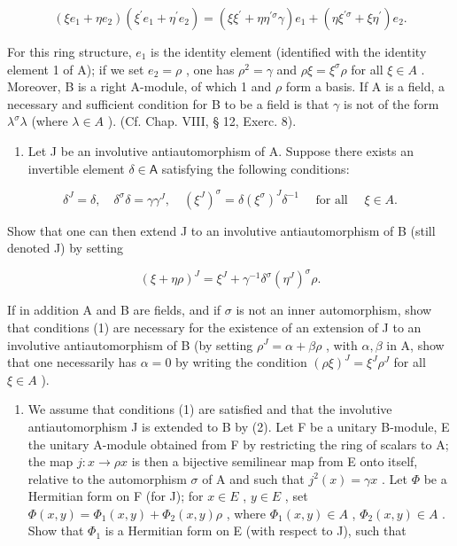 \[
(\xi e _ {1} + \eta e _ {2}) (\xi^ {\prime} e _ {1} + \eta^ {\prime} e _ {2}) = (\xi \xi^ {\prime} + \eta \eta^ {\prime \sigma} \gamma) e _ {1} + (\eta \xi^ {\prime \sigma} + \xi \eta^ {\prime}) e _ {2}.
\]

For this ring structure, \(e_1\) is the identity element (identified with the identity element 1 of A); if we set \(e_2 = \rho\) , one has \(\rho^2 = \gamma\) and \(\rho\xi = \xi^\sigma\rho\) for all \(\xi \in A\) . Moreover, B is a right A-module, of which 1 and \(\rho\) form a basis. If A is a field, a necessary and sufficient condition for B to be a field is that \(\gamma\) is not of the form \(\lambda^\sigma\lambda\) (where \(\lambda \in A\) ). (Cf. Chap. VIII, § 12, Exerc. 8).

\begin{enumerate}
\def\labelenumi{\alph{enumi})}
\setcounter{enumi}{1}
\tightlist
\item
  Let J be an involutive antiautomorphism of A. Suppose there exists an invertible element \(\delta\in\mathsf{A}\) satisfying the following conditions:
\end{enumerate}

\[
\delta^ {J} = \delta , \quad \delta^ {\sigma} \delta = \gamma \gamma^ {J}, \quad (\xi^ {J}) ^ {\sigma} = \delta (\xi^ {\sigma}) ^ {J} \delta^ {- 1} \quad \text { for   all } \quad \xi \in A.\tag{1}
\]

Show that one can then extend J to an involutive antiautomorphism of B (still denoted J) by setting

\[
(\xi + \eta \rho) ^ {J} = \xi^ {J} + \gamma^ {- 1} \delta^ {\sigma} (\eta^ {J}) ^ {\sigma} \rho .\tag{2}
\]

If in addition A and B are fields, and if \(\sigma\) is not an inner automorphism, show that conditions (1) are necessary for the existence of an extension of J to an involutive antiautomorphism of B (by setting \(\rho^{J} = \alpha + \beta\rho\) , with \(\alpha, \beta\) in A, show that one necessarily has \(\alpha = 0\) by writing the condition \((\rho\xi)^{J} = \xi^{J}\rho^{J}\) for all \(\xi \in A\) ).

\begin{enumerate}
\def\labelenumi{\alph{enumi})}
\setcounter{enumi}{2}
\tightlist
\item
  We assume that conditions (1) are satisfied and that the involutive antiautomorphism J is extended to B by (2). Let F be a unitary B-module, E the unitary A-module obtained from F by restricting the ring of scalars to A; the map \(j: x \to \rho x\) is then a bijective semilinear map from E onto itself, relative to the automorphism \(\sigma\) of A and such that \(j^{2}(x) = \gamma x\) . Let \(\Phi\) be a Hermitian form on F (for J); for \(x \in E\) , \(y \in E\) , set \(\Phi(x, y) = \Phi_{1}(x, y) + \Phi_{2}(x, y)\rho\) , where \(\Phi_{1}(x, y) \in A\) , \(\Phi_{2}(x, y) \in A\) . Show that \(\Phi_{1}\) is a Hermitian form on E (with respect to J), such that
\end{enumerate}

